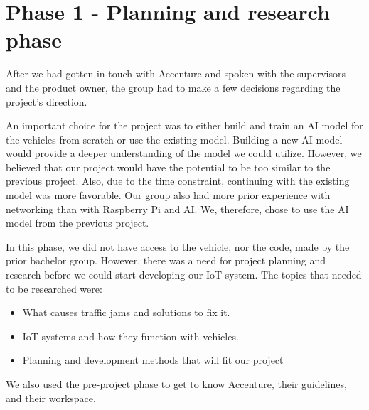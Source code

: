 \section{Phase 1 - Planning and research phase}\label{sec:phase1}

After we had gotten in touch with Accenture and spoken with the supervisors and the product owner, the group had to make a few decisions regarding the project's direction.

An important choice for the project was to either build and train an AI model for the vehicles from scratch or use the existing model. Building a new AI model would provide a deeper understanding of the model we could utilize. However, we believed that our project would have the potential to be too similar to the previous project. Also, due to the time constraint, continuing with the existing model was more favorable. Our group also had more prior experience with networking than with Raspberry Pi and AI. We, therefore, chose to use the AI model from the previous project. 

In this phase, we did not have access to the vehicle, nor the code, made by the prior bachelor group. However, there was a need for project planning and research before we could start developing our IoT system. The topics that needed to be researched were:

\begin{itemize}
\item What causes traffic jams and solutions to fix it.
\item IoT-systems and how they function with vehicles.
\item Planning and development methods that will fit our project
\end{itemize}

We also used the pre-project phase to get to know Accenture, their guidelines, and their workspace.











\clearpage